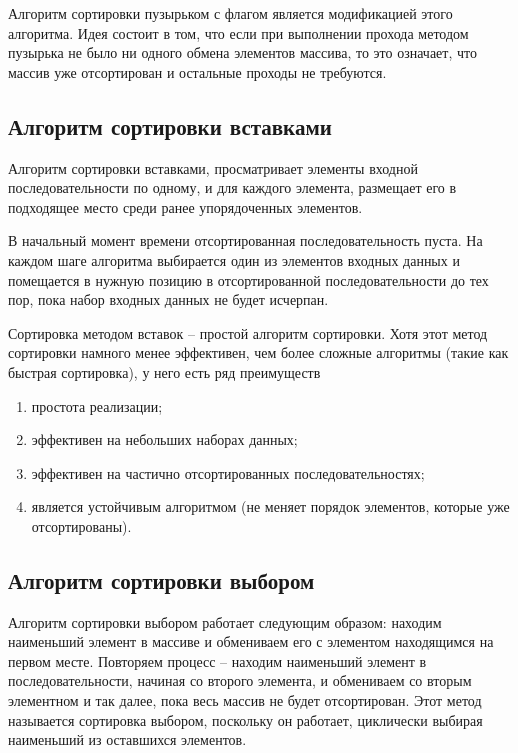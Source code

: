 \documentclass[utf8x, 12pt]{G7-32}
\begin{document}
            Алгоритм сортировки пузырьком с флагом является модификацией этого алгоритма.
            Идея состоит в том, что если при выполнении прохода методом пузырька не 
            было ни одного обмена элементов массива, то это означает, что массив уже
            отсортирован и остальные проходы не требуются.

        \subsection{ Алгоритм сортировки вставками}
            Алгоритм сортировки вставками, просматривает элементы входной последовательности по одному,
            и для каждого элемента, размещает его в подходящее место среди ранее упорядоченных элементов.
            
            В начальный момент времени отсортированная последовательность пуста. 
            На каждом шаге алгоритма выбирается один из элементов входных данных и
            помещается в нужную позицию в отсортированной последовательности до тех пор,
            пока набор входных данных не будет исчерпан. 
            
            Сортировка методом вставок -- простой алгоритм сортировки. 
            Хотя этот метод сортировки намного менее эффективен,
            чем более сложные алгоритмы (такие как быстрая сортировка), у него есть ряд преимуществ
            \begin{enumerate}
                \item простота реализации;
                \item эффективен на небольших наборах данных;
                \item эффективен на частично отсортированных последовательностях;
                \item является устойчивым алгоритмом (не меняет порядок элементов, которые уже отсортированы).
            \end{enumerate}

        \subsection{ Алгоритм сортировки выбором}
            Алгоритм сортировки выбором работает следующим образом: 
            находим наименьший элемент в массиве и обмениваем его с элементом находящимся на первом месте.
            Повторяем процесс -- находим наименьший элемент в последовательности, начиная со второго элемента, и
            обмениваем со вторым элементном и так далее, пока весь массив не будет отсортирован.
            Этот метод называется сортировка выбором, поскольку он работает, 
            циклически выбирая наименьший из оставшихся элементов.
\end{document}
